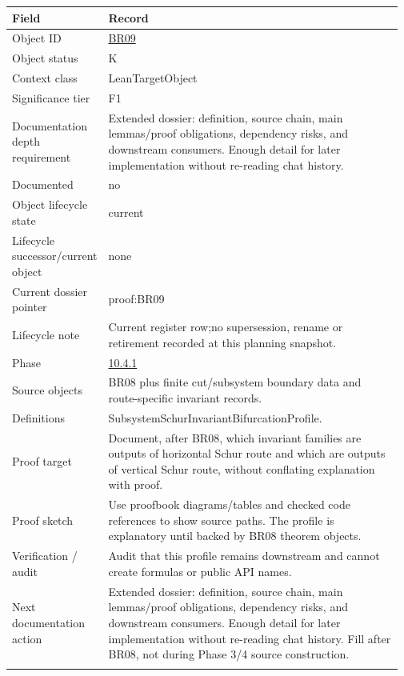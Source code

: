 \begin{longtable}{L{0.16\linewidth} L{0.81\linewidth}}
\hline
\textbf{Field} & \textbf{Record}\\
\hline
Object ID & \hyperlink{object-row-BR09}{BR09}\\
\hline\addlinespace[0.20em]
Object status & K\\
\hline\addlinespace[0.20em]
Context class & LeanTargetObject\\
\hline\addlinespace[0.20em]
Significance tier & F1\\
\hline\addlinespace[0.20em]
Documentation depth requirement & Extended dossier: definition, source chain, main lemmas/\allowbreak{}proof obligations, dependency risks, and downstream consumers. Enough detail for later implementation without re-reading chat history.\\
\hline\addlinespace[0.20em]
Documented & no\\
\hline\addlinespace[0.20em]
Object lifecycle state & current\\
\hline\addlinespace[0.20em]
Lifecycle successor/\allowbreak{}current object & none\\
\hline\addlinespace[0.20em]
Current dossier pointer & proof:BR09\\
\hline\addlinespace[0.20em]
Lifecycle note & Current register row;\newline no supersession, rename or retirement recorded at this planning snapshot.\\
\hline\addlinespace[0.20em]
Phase & \hyperlink{phase-row-10-4-1}{10.4.1}\\
\hline\addlinespace[0.20em]
Source objects & BR08 plus finite cut/\allowbreak{}subsystem boundary data and route-specific invariant records.\\
\hline\addlinespace[0.20em]
Definitions & SubsystemSchurInvariantBifurcationProfile.\\
\hline\addlinespace[0.20em]
Proof target & Document, after BR08, which invariant families are outputs of horizontal Schur route and which are outputs of vertical Schur route, without conflating explanation with proof.\\
\hline\addlinespace[0.20em]
Proof sketch & Use proofbook diagrams/\allowbreak{}tables and checked code references to show source paths. The profile is explanatory until backed by BR08 theorem objects.\\
\hline\addlinespace[0.20em]
Verification /\allowbreak{} audit & Audit that this profile remains downstream and cannot create formulas or public API names.\\
\hline\addlinespace[0.20em]
Next documentation action & Extended dossier: definition, source chain, main lemmas/\allowbreak{}proof obligations, dependency risks, and downstream consumers. Enough detail for later implementation without re-reading chat history. Fill after BR08, not during Phase 3/\allowbreak{}4 source construction.\\
\hline\addlinespace[0.20em]
\end{longtable}

